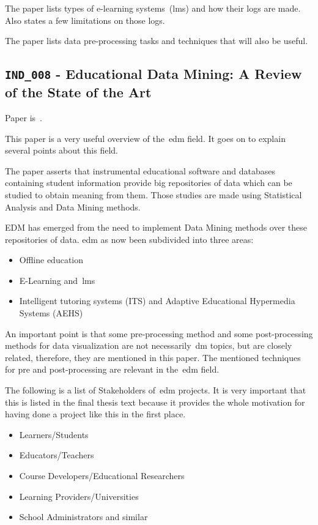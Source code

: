 The paper lists types of e-learning systems~(\gls{lms}) and how their logs are
made. Also states a few limitations on those logs.

The paper lists data pre-processing tasks and techniques that will also be
useful.

\subsection{\texttt{IND\_008} - Educational Data Mining: A Review of the State of
the Art}

Paper is~\cite{ind_008}.

This paper is a very useful overview of the~\gls{edm} field. It goes on to
explain several points about this field.

The paper asserts that instrumental educational software and databases
containing student information provide big repositories of data which can be
studied to obtain meaning from them. Those studies are made using Statistical
Analysis and Data Mining methods.

EDM has emerged from the need to implement Data Mining methods over these
repositories of data. \gls{edm} as now been subdivided into three areas:

\begin{itemize}
    \item Offline education
    \item E-Learning and~\gls{lms}
    \item Intelligent tutoring systems (ITS) and Adaptive Educational
        Hypermedia Systems (AEHS)
\end{itemize}

An important point is that some pre-processing method and some post-processing
methods for data visualization are not necessarily~\gls{dm} topics, but are
closely related, therefore, they are mentioned in this paper. The mentioned
techniques for pre and post-processing are relevant in the~\gls{edm} field.

The following is a list of Stakeholders of~\gls{edm} projects. It is very
important that this is listed in the final thesis text because it provides the
whole motivation for having done a project like this in the first place.

\begin{itemize}
    \item Learners/Students
    \item Educators/Teachers
    \item Course Developers/Educational Researchers
    \item Learning Providers/Universities
    \item School Administrators and similar
\end{itemize}

